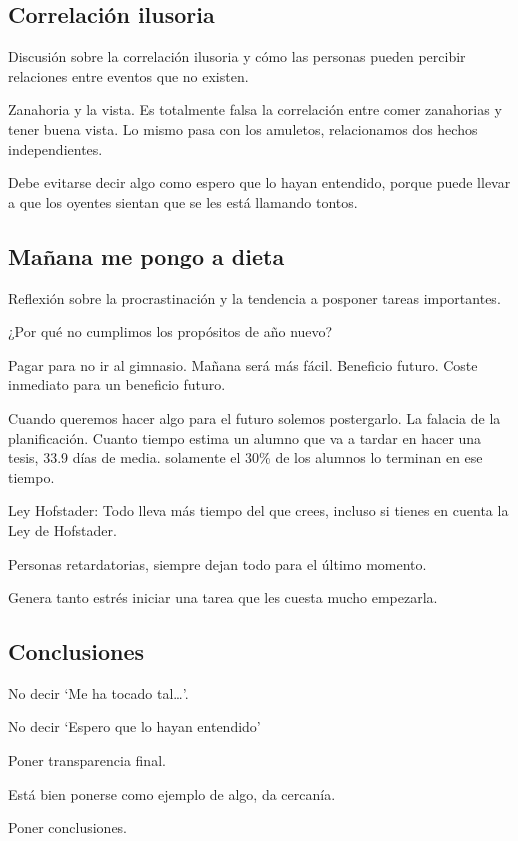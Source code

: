 \documentclass[12pt, a4paper, twoside]{article}
\begin{document}
\subsection{Correlación ilusoria}
Discusión sobre la correlación ilusoria y cómo las personas pueden percibir relaciones entre eventos que no existen.

Zanahoria y la vista. Es totalmente falsa la correlación entre comer zanahorias y tener buena vista. Lo mismo pasa con los 
amuletos, relacionamos dos hechos independientes.

Debe evitarse decir algo como espero que lo hayan entendido, porque puede llevar a que los oyentes sientan que se les está llamando tontos.


\subsection{Mañana me pongo a dieta}
Reflexión sobre la procrastinación y la tendencia a posponer tareas importantes.

¿Por qué no cumplimos los propósitos de año nuevo?

Pagar para no ir al gimnasio. Mañana será más fácil. Beneficio futuro. 
Coste inmediato para un beneficio futuro.

Cuando queremos hacer algo para el futuro solemos postergarlo. La falacia de la planificación. 
Cuanto tiempo estima un alumno que va a tardar en hacer una tesis, 33.9 días de media. solamente el 30\%
de los alumnos lo terminan en ese tiempo.

Ley Hofstader: Todo lleva más tiempo del que crees, incluso si tienes en cuenta la Ley de Hofstader.

Personas retardatorias, siempre dejan todo para el último momento.

Genera tanto estrés iniciar una tarea que les cuesta mucho empezarla.

\subsection{Conclusiones}

No decir `Me ha tocado tal\ldots'.


No decir `Espero que lo hayan entendido'

Poner transparencia final.

Está bien ponerse como ejemplo de algo, da cercanía.

Poner conclusiones.

\newpage
\end{document}
